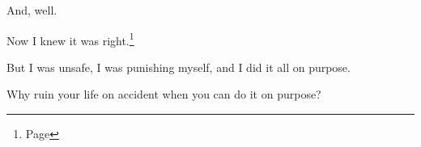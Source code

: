 \begin{paracol}{2}
\begin{leftcolumn}
And, well.

Now I knew it was right.\footnote{\color[HTML]{dddddd}Page \pageref{gender:gender}}

But I was unsafe, I was punishing myself, and I did it all on purpose.

\begin{ally}
Why ruin your life on accident when you can do it on purpose?
\end{ally}
\newpage
\null
\thispagestyle{empty}
\newpage

\end{leftcolumn}
\end{paracol}
\resetbackgroundcolor
\renewcommand*{\footnoterule}{\oldfootnoterule}
